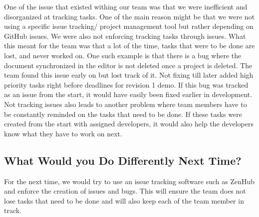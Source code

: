 \documentclass{article}
\begin{document}
	One of the issue that existed withing our team was that we were inefficient and disorganized at tracking tasks. One of the main reason might be that we were not using a specific issue tracking/ project management tool but rather depending on GitHub issues. We were also not enforcing tracking tasks through issues. What this meant for the team was that a lot of the time, tasks that were to be done are lost, and never worked on. One such example is that there is a bug where the document synchronized in the editor is not deleted once a project is deleted. The team found this issue early on but lost track of it. Not fixing till later added high priority tasks right before deadlines for revision 1 demo. If this bug was tracked as an issue from the start, it would have easily been fixed earlier in development. Not tracking issues also leads to another problem where team members have to be constantly reminded on the tasks that need to be done. If these tasks were created from the start with assigned developers, it would also help the developers know what they have to work on next.
	
	\subsection{What Would you Do Differently Next Time?}
	
	For the next time, we would try to use an issue tracking software such as ZenHub and enforce the creation of issues and bugs. This will ensure the team does not lose tasks that need to be done and will also keep each of the team member in track.
	
\end{document}
